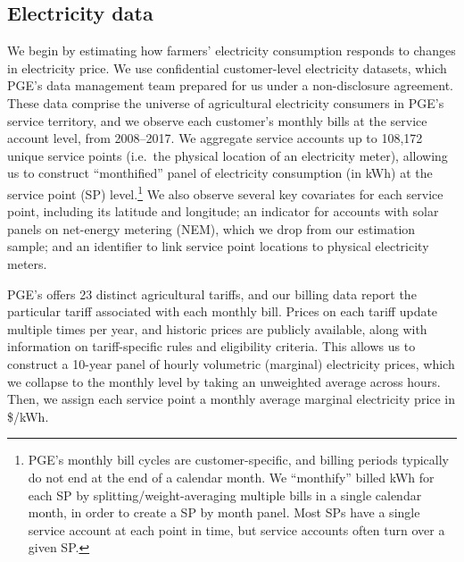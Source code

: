 %
%

\subsection{Electricity data}

We begin by estimating how farmers' electricity consumption responds to changes in electricity price. We use confidential customer-level electricity datasets, which PGE's data management team prepared for us under a non-disclosure agreement. These data comprise the universe of agricultural electricity consumers in PGE's service territory, and we observe each customer's monthly bills at the service account level, from 2008--2017. We aggregate service accounts up to 108,172 unique service points (i.e.\ the physical location of an electricity meter), allowing us to construct ``monthified'' panel of electricity consumption (in kWh) at the service point (SP) level.\footnote{
PGE's monthly bill cycles are customer-specific, and billing periods typically do not end at the end of a calendar month. We ``monthify'' billed kWh for each SP by splitting/weight-averaging multiple bills in a single calendar month, in order to create a SP by month panel. Most SPs have a single service account at each point in time, but service accounts often turn over a given SP.
}
We also observe several key covariates for each service point, including its latitude and longitude; an indicator for accounts with solar panels on net-energy metering (NEM), which we drop from our estimation sample; and an identifier to link service point locations to physical electricity meters.

PGE's offers 23 distinct agricultural tariffs, and our billing data report the particular tariff associated with each monthly bill. Prices on each tariff update multiple times per year, and historic prices are publicly available, along with information on tariff-specific rules and eligibility criteria. This allows us to construct a 10-year panel of hourly volumetric (marginal) electricity prices, which we collapse to the monthly level by taking an unweighted average across hours. Then, we assign each service point a monthly average marginal electricity price in \$/kWh.

